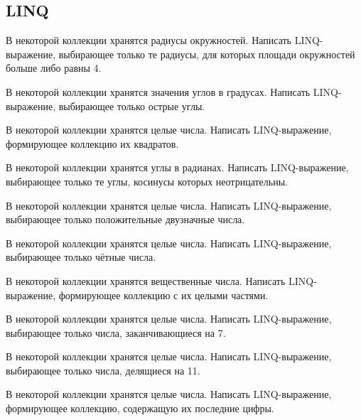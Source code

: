 \subsection{LINQ}

\task В некоторой коллекции хранятся радиусы окружностей. Написать
LINQ-выражение, выбирающее только те радиусы, для которых площади
окружностей больше либо равны 4.

\task В некоторой коллекции хранятся значения углов в
градусах. Написать LINQ-выражение, выбирающее только острые углы.

\task В некоторой коллекции хранятся целые числа. Написать
LINQ-выражение, формирующее коллекцию их квадратов.

\task В некоторой коллекции хранятся углы в радианах. Написать
LINQ-выражение, выбирающее только те углы, косинусы которых
неотрицательны.

\task В некоторой коллекции хранятся целые числа. Написать
LINQ-выражение, выбирающее только положительные двузначные числа.

\task В некоторой коллекции хранятся целые числа. Написать
LINQ-выражение, выбирающее только чётные числа.

\task В некоторой коллекции хранятся вещественные числа. Написать
LINQ-выражение, формирующее коллекцию с их целыми частями.

\task В некоторой коллекции хранятся целые числа. Написать
LINQ-выражение, выбирающее только числа, заканчивающиеся на 7.

\task В некоторой коллекции хранятся целые числа. Написать
LINQ-выражение, выбирающее только числа, делящиеся на 11.

\task В некоторой коллекции хранятся целые числа. Написать
LINQ-выражение, формирующее коллекцию, содержащую их последние цифры.
